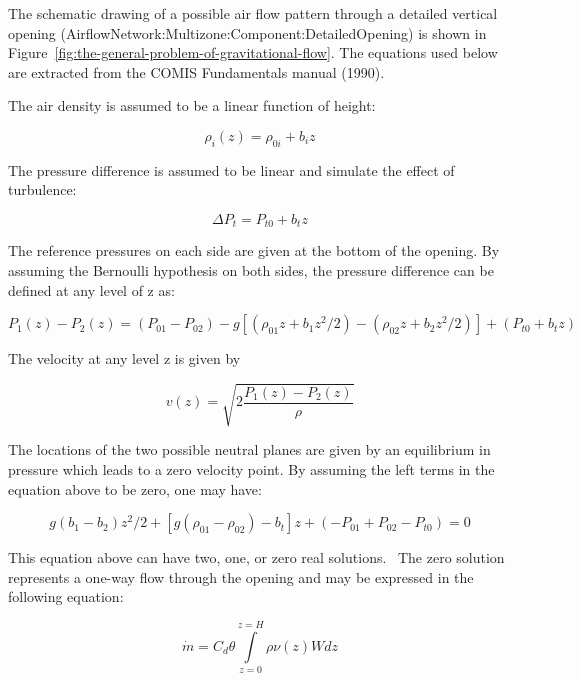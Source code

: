The schematic drawing of a possible air flow pattern through a detailed vertical opening (AirflowNetwork:Multizone:Component:DetailedOpening) is shown in Figure~\ref{fig:the-general-problem-of-gravitational-flow}. The equations used below are extracted from the COMIS Fundamentals manual (1990).

The air density is assumed to be a linear function of height:

\begin{equation}
{\rho_i}(z) = {\rho_{0i}} + {b_i}z
\end{equation}

The pressure difference is assumed to be linear and simulate the effect of turbulence:

\begin{equation}
\Delta P_t = P_{t0} + b_t z
\end{equation}

The reference pressures on each side are given at the bottom of the opening. By assuming the Bernoulli hypothesis on both sides, the pressure difference can be defined at any level of z as:

\begin{equation}
{P_1}(z) - {P_2}(z) = ({P_{01}} - {P_{02}}) - g\left[ {({\rho_{01}}z + {b_1}{z^2}/2) - ({\rho_{02}}z + {b_2}{z^2}/2)} \right] + ({P_{t0}} + {b_t}z)
\end{equation}

The velocity at any level z is given by

\begin{equation}
v(z) = \sqrt {2\frac{{{P_1}(z) - {P_2}(z)}}{\rho }}
\end{equation}

The locations of the two possible neutral planes are given by an equilibrium in pressure which leads to a zero velocity point. By assuming the left terms in the equation above to be zero, one may have:

\begin{equation}
g({b_1} - {b_2}){z^2}/2 + \left[ {g({\rho_{01}} - {\rho_{02}}) - {b_t}} \right]z + ( - {P_{01}} + {P_{02}} - {P_{t0}}) = 0
\end{equation}

This equation above can have two, one, or zero real solutions.~ The zero solution represents a one-way flow through the opening and may be expressed in the following equation:

\begin{equation}
\dot m = {C_d}\theta \int\limits_{z = 0}^{z = H} {\rho \nu (z)Wdz}
\end{equation}

